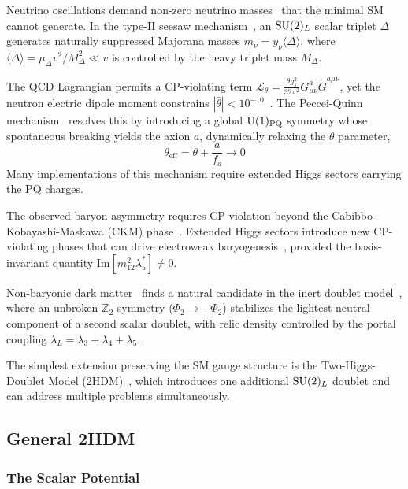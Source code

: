 Neutrino oscillations demand non-zero neutrino masses~\cite{SuperK:1998kpq,SNO:2002tuh} that the minimal SM cannot generate. In the type-II seesaw mechanism~\cite{Minkowski:1977sc,Mohapatra:1979ia}, an $\mathrm{SU}(2)_L$ scalar triplet $\Delta$ generates naturally suppressed Majorana masses $m_\nu = y_\nu \langle\Delta\rangle$, where $\langle\Delta\rangle = \mu_\Delta v^2/M_\Delta^2 \ll v$ is controlled by the heavy triplet mass $M_\Delta$.

The QCD Lagrangian permits a CP-violating term $\mathcal{L}_{\theta} = \frac{\theta g_s^2}{32\pi^2}G^a_{\mu\nu}\tilde{G}^{a\mu\nu}$, yet the neutron electric dipole moment constrains $|\bar{\theta}| < 10^{-10}$~\cite{Abel:2020pzs}. The Peccei-Quinn mechanism~\cite{Peccei:1977hh} resolves this by introducing a global $\mathrm{U}(1)_{\text{PQ}}$ symmetry whose spontaneous breaking yields the axion $a$, dynamically relaxing the $\theta$ parameter,
\begin{equation}
\bar{\theta}_{\text{eff}} = \bar{\theta} + \frac{a}{f_a} \to 0
\end{equation}
Many implementations of this mechanism require extended Higgs sectors carrying the PQ charges.

The observed baryon asymmetry requires CP violation beyond the Cabibbo-Kobayashi-Maskawa (CKM) phase~\cite{Sakharov:1967dj}. Extended Higgs sectors introduce new CP-violating phases that can drive electroweak baryogenesis~\cite{Morrissey:2012db}, provided the basis-invariant quantity $\text{Im}[m_{12}^2 \lambda_5^*] \neq 0$.

Non-baryonic dark matter~\cite{Planck:2018vyg} finds a natural candidate in the inert doublet model~\cite{Deshpande:1977rw}, where an unbroken $\mathbb{Z}_2$ symmetry ($\Phi_2 \to -\Phi_2$) stabilizes the lightest neutral component of a second scalar doublet, with relic density controlled by the portal coupling $\lambda_L = \lambda_3 + \lambda_4 + \lambda_5$.

The simplest extension preserving the SM gauge structure is the Two-Higgs-Doublet Model (2HDM)~\cite{Branco:2011iw}, which introduces one additional $\mathrm{SU}(2)_L$ doublet and can address multiple problems simultaneously.

\subsection{General 2HDM}

\subsubsection{The Scalar Potential}

